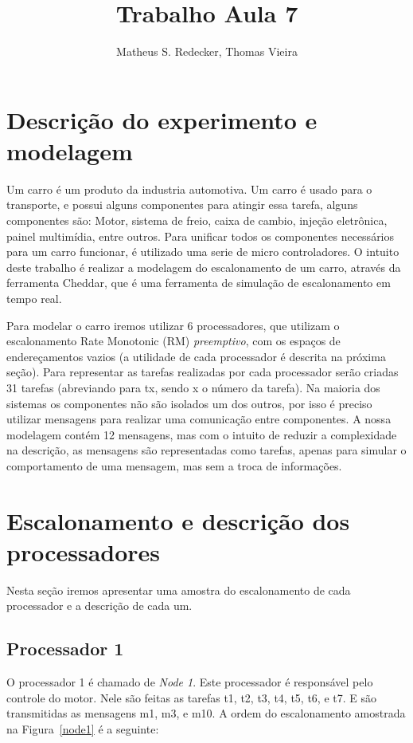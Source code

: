\documentclass[12pt]{article}
\title{Trabalho Aula 7}
\author{Matheus S. Redecker\inst{1}, Thomas Vieira\inst{1}}
\begin{document}
 

\maketitle


\section{Descrição do experimento e modelagem}

Um carro é um produto da industria automotiva. Um carro é usado para o transporte, e possui alguns componentes para atingir essa tarefa, alguns componentes são: Motor, sistema de freio, caixa de cambio, injeção eletrônica, painel multimídia, entre outros. Para unificar todos os componentes necessários para um carro funcionar, é utilizado uma serie de micro controladores. O intuito deste trabalho é realizar a modelagem do escalonamento de um carro, através da ferramenta Cheddar, que é uma ferramenta de simulação de escalonamento em tempo real.

Para modelar o carro iremos utilizar 6 processadores, que utilizam o escalonamento Rate Monotonic (RM) \textit{preemptivo}, com os espaços de endereçamentos vazios (a utilidade de cada processador é descrita na próxima seção). Para representar as tarefas realizadas por cada processador  serão criadas 31 tarefas (abreviando para tx, sendo x o número da tarefa). Na maioria dos sistemas os componentes não são isolados um dos outros, por isso é preciso utilizar mensagens para realizar uma comunicação entre componentes. A nossa modelagem contém 12 mensagens, mas com o intuito de reduzir a complexidade na descrição, as mensagens são representadas como tarefas, apenas para simular o comportamento de uma mensagem, mas sem a troca de informações. 

\section{Escalonamento e descrição dos processadores}

Nesta seção iremos apresentar uma amostra do escalonamento de cada processador e a descrição de cada um.

\subsection{Processador 1}

O processador 1 é chamado de \textit{Node 1}. Este processador é responsável pelo controle do motor. Nele são feitas as tarefas t1, t2, t3, t4, t5, t6, e t7. E são transmitidas as mensagens m1, m3, e m10. 
A ordem do escalonamento amostrada na Figura~\ref{node1} é a seguinte:
\end{document}
